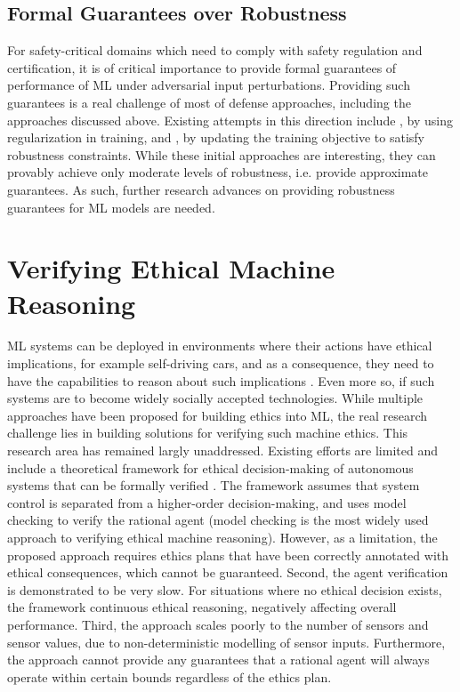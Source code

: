 \documentclass[letterpaper]{article} %
\begin{document}
\subsection{Formal Guarantees over Robustness}
For safety-critical domains which need to comply with safety regulation and certification, it is of critical importance to provide formal guarantees of performance of ML under adversarial input perturbations. Providing such guarantees is a real challenge of most of defense approaches, including the approaches discussed above. Existing attempts in this direction include \cite{Hein2017}, by using regularization in training, and \cite{Sinha2018}, by updating the training objective to satisfy robustness constraints. While these initial approaches are interesting, they can provably achieve only moderate levels of robustness, i.e. provide approximate guarantees. As such, further research advances on providing robustness guarantees for ML models are needed. 

\section{Verifying Ethical Machine Reasoning}
ML systems can be deployed in environments where their actions have ethical implications, for example self-driving cars, and as a consequence, they need to have the capabilities to reason about such implications \cite{Deng2015}. Even more so, if such systems are to become widely socially accepted technologies. While multiple approaches have been proposed for building ethics into ML, the real research challenge lies in building solutions for verifying such machine ethics. This research area has remained largly unaddressed. Existing efforts are limited and include a theoretical framework for ethical decision-making of autonomous systems that can be formally verified \cite{Dennis2016}. The framework assumes that system control is separated from a higher-order decision-making, and uses model checking to verify the rational agent (model checking is the most widely used approach to verifying ethical machine reasoning). However, as a limitation, the proposed approach requires ethics plans that have been correctly annotated with ethical consequences, which cannot be guaranteed. Second, the agent verification is demonstrated to be very slow. For situations where no ethical decision exists, the framework continuous ethical reasoning, negatively affecting overall performance. Third, the approach scales poorly to the number of sensors and sensor values, due to non-deterministic modelling of sensor inputs. Furthermore, the approach cannot provide any guarantees that a rational agent will always operate within certain bounds regardless of the ethics plan. 
\end{document}

